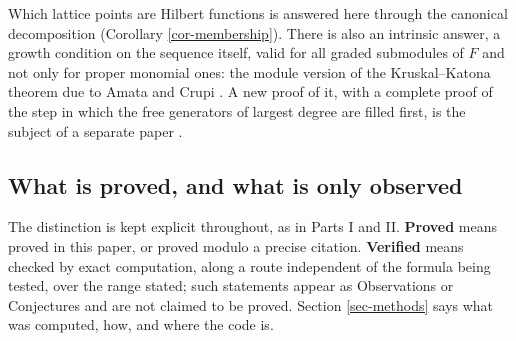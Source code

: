 \documentclass[11pt, a4paper, abstract=yes]{scrartcl}
\theoremstyle{definition}
\theoremstyle{remark}
\theoremstyle{plain}
\theoremstyle{remark}
\theoremstyle{plain}
\let\autocite\cite
\begin{document}
Which lattice points are Hilbert functions is answered here through the canonical decomposition
(Corollary \ref{cor-membership}). There is also an intrinsic answer, a growth condition on the
sequence itself, valid for all graded submodules of \(F\) and not only for proper monomial ones:
the module version of the Kruskal--Katona theorem due to Amata and Crupi
\autocite[Theorem 4.2]{AmataCrupi2020KK}. A new proof of it, with a complete proof of the step in which
the free generators of largest degree are filled first, is the subject of a separate paper
\autocite{SnellmanArticle5}.
\subsection{What is proved, and what is only observed}
\label{sec:org3e2c560}

The distinction is kept explicit throughout, as in Parts I and II. \textbf{Proved} means proved in this
paper, or proved modulo a precise citation. \textbf{Verified} means checked by exact computation, along
a route independent of the formula being tested, over the range stated; such statements appear as
Observations or Conjectures and are not claimed to be proved. Section \ref{sec-methods} says what
was computed, how, and where the code is.
\end{document}
